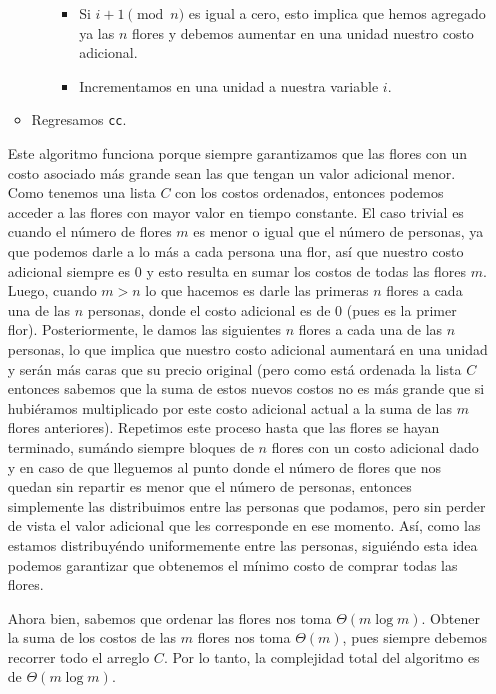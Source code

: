\documentclass[letterpaper,11pt]{article}
\begin{document}
\begin{enumerate}
\begin{itemize}
\begin{itemize}
\begin{itemize}
                \item Si $i+1 \pmod{n}$ es igual a cero, esto implica que hemos 
                agregado ya las $n$ flores y debemos aumentar en una unidad 
                nuestro costo adicional.

                \item Incrementamos en una unidad a nuestra variable $i$.
            \end{itemize}
        \end{itemize}

        \item Regresamos \texttt{cc}.
    \end{itemize}

    Este algoritmo funciona porque siempre garantizamos que las flores con 
    un costo asociado más grande sean las que tengan un valor adicional 
    menor. Como tenemos una lista $C$ con los costos ordenados, entonces 
    podemos acceder a las flores con mayor valor en tiempo constante. El 
    caso trivial es cuando el número de flores $m$ es menor o igual que el 
    número de personas, ya que podemos darle a lo más a cada persona una 
    flor, así que nuestro costo adicional siempre es $0$ y esto resulta en 
    sumar los costos de todas las flores $m$. Luego, cuando $m > n$ lo 
    que hacemos es darle las primeras $n$ flores a cada una de las $n$
    personas, donde el costo adicional es de $0$ (pues es la primer flor). 
    Posteriormente, le damos las siguientes $n$ flores a cada una de las $n$ 
    personas, lo que implica que nuestro costo adicional aumentará en una 
    unidad y serán más caras que su precio original (pero como está ordenada 
    la lista $C$ entonces sabemos que la suma de estos nuevos costos no es 
    más grande que si hubiéramos multiplicado por este costo adicional actual 
    a la suma de las $m$ flores anteriores). Repetimos este proceso hasta que 
    las flores se hayan terminado, sumándo siempre bloques de $n$ flores con 
    un costo adicional dado y en caso de que lleguemos al punto donde el número 
    de flores que nos quedan sin repartir es menor que el número de personas, 
    entonces simplemente las distribuimos entre las personas que podamos, 
    pero sin perder de vista el valor adicional que les corresponde en ese
    momento. Así, como las estamos distribuyéndo uniformemente entre las 
    personas, siguiéndo esta idea podemos garantizar que obtenemos el mínimo
    costo de comprar todas las flores. 

    Ahora bien, sabemos que ordenar las flores nos toma $\Theta(m \log m)$.
    Obtener la suma de los costos de las $m$ flores nos toma $\Theta(m)$, 
    pues siempre debemos recorrer todo el arreglo $C$. Por lo tanto, la 
    complejidad total del algoritmo es de $\Theta(m \log m)$.


\end{enumerate}
\end{document}
